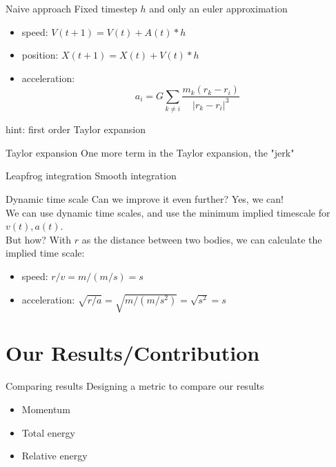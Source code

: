 \documentclass{beamer}
\begin{document}
\begin{frame}{Naive approach}
  Fixed timestep $h$ and only an euler approximation
  \begin{itemize}
    \item
      speed: $V(t+1) = V(t) + A(t)*h$ 
    \item
      position: $X(t+1) = X(t) + V(t)*h$
    \item
      acceleration: \begin{equation} a_i = G \sum_{k \neq i} \frac{m_k(r_k - r_i)}{|r_k - r_i|^3}\end{equation}
  \end{itemize}

  hint: first order Taylor expansion
\end{frame}

\begin{frame}{Taylor expansion}
  One more term in the Taylor expansion, the "jerk"
\end{frame}

\begin{frame}{Leapfrog integration}
  Smooth integration
\end{frame}


\begin{frame}{Dynamic time scale}
  Can we improve it even further? Yes, we can!\\
  We can use dynamic time scales, and use the minimum implied timescale for $v(t),a(t)$. \\
  But how? With $r$ as the distance between two bodies, we can calculate the implied time scale:
  \begin{itemize}
    \item speed: $r/v= m/(m/s) = s$
    \item acceleration: $\sqrt{r/a} = \sqrt{m/(m/s^2)}  = \sqrt{s^2} = s$
  \end{itemize}
\end{frame}

\section{Our Results/Contribution}

\begin{frame}{Comparing results}
Designing a metric to compare our results
 \begin{itemize}
	\item
		Momentum
	\item
		Total energy
	\item 
		Relative energy
 \end{itemize}
\end{frame}
\end{document}
